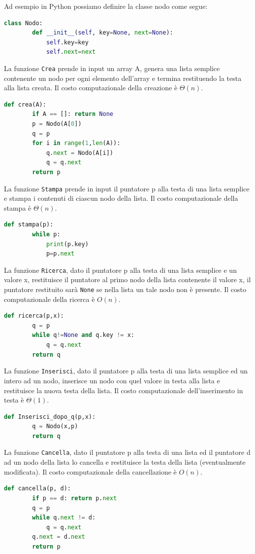 Ad esempio in Python possiamo definire la classe nodo come segue:
\begin{lstlisting}[language=Python]
    class Nodo:
        def __init__(self, key=None, next=None):
            self.key=key
            self.next=next
\end{lstlisting}
La funzione \verb|Crea| prende in input un array A, genera una lista semplice contenente un nodo per ogni elemento dell'array e termina restituendo la testa alla lista creata. Il costo computazionale della creazione è $\Theta(n)$.
\begin{lstlisting}[language=Python]
    def crea(A):
        if A == []: return None
        p = Nodo(A[0])
        q = p
        for i in range(1,len(A)):
            q.next = Nodo(A[i])
            q = q.next
        return p
\end{lstlisting}
La funzione \verb|Stampa| prende in input il puntatore p alla testa di una lista semplice e stampa i contenuti di ciascun nodo della lista. Il costo computazionale della stampa è $\Theta(n)$.
\begin{lstlisting}[language=Python]     
    def stampa(p):
        while p:
            print(p.key)
            p=p.next
\end{lstlisting}
La funzione \verb|Ricerca|, dato il puntatore p alla testa di una lista semplice e un valore x, restituisce il puntatore al primo nodo della lista contenente il valore x, il puntatore restituito sarà \verb|None| se nella lista un tale nodo non è presente. Il costo computazionale della ricerca è $O(n)$.
\begin{lstlisting}[language=Python]     
    def ricerca(p,x):
        q = p
        while q!=None and q.key != x:
            q = q.next
        return q
\end{lstlisting}

La funzione \verb|Inserisci|, dato il puntatore p alla testa di una lista semplice ed un intero ad un nodo, inserisce un nodo con quel valore in testa alla lista e restituisce la nuova testa della lista. Il costo computazionale dell'inserimento in testa è $\Theta(1)$.
\begin{lstlisting}[language=Python]
    def Inserisci_dopo_q(p,x):
        q = Nodo(x,p)
        return q
\end{lstlisting}

La funzione \verb|Cancella|, dato il puntatore p alla testa di una lista ed il puntatore d ad un nodo della lista
lo cancella e restituisce la testa della lista (eventualmente modificata). Il costo computazionale della cancellazione è $O(n)$.
\begin{lstlisting}[language=Python]
    def cancella(p, d):
        if p == d: return p.next
        q = p
        while q.next != d:
            q = q.next
        q.next = d.next
        return p
\end{lstlisting}

